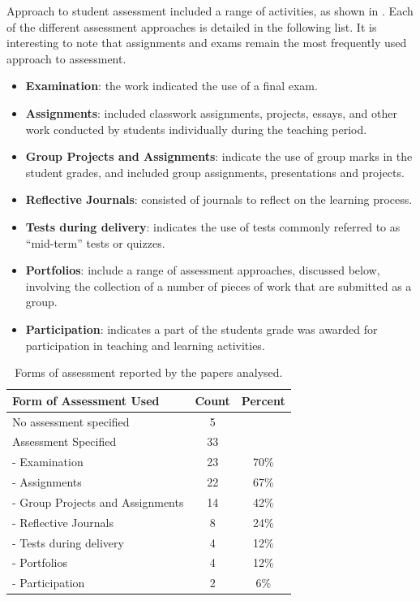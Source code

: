 Approach to student assessment included a range of activities, as shown in . Each of the different assessment approaches is detailed in the following list. It is interesting to note that assignments and exams remain the most frequently used approach to assessment.

\begin{itemize}[noitemsep,nolistsep]
	\item \textbf{Examination}: the work indicated the use of a final exam.
	\item \textbf{Assignments}: included classwork assignments, projects, essays, and other work conducted by students individually during the teaching period.
	\item \textbf{Group Projects and Assignments}: indicate the use of group marks in the student grades, and included group assignments, presentations and projects.
	\item \textbf{Reflective Journals}: consisted of journals to reflect on the learning process.
	\item \textbf{Tests during delivery}: indicates the use of tests commonly referred to as ``mid-term'' tests or quizzes.
	\item \textbf{Portfolios}: include a range of assessment approaches, discussed below, involving the collection of a number of pieces of work that are submitted as a group.
	\item \textbf{Participation}: indicates a part of the students grade was awarded for participation in teaching and learning activities.
\end{itemize}

\begin{table}[htbp]
	\centering
	\caption{Forms of assessment reported by the papers analysed.}
	\label{tbl:assessment_types}
	\footnotesize
    \begin{tabular}{l|c|c}
     \textbf{Form of Assessment Used} & \textbf{Count} & \textbf{Percent} \\ \hline
No assessment specified & 	5	 \\
Assessment Specified	 & 33	 \\
- Examination	 & 23	 & 70\% \\
- Assignments	 & 22	 & 67\% \\
- Group Projects and Assignments	 & 14	 & 42\% \\
- Reflective Journals & 	8	 & 24\% \\
- Tests during delivery & 	4	 & 12\% \\
- Portfolios & 	4	 & 12\% \\
- Participation &	2 & 	6\% \\
    \end{tabular}
\end{table}

